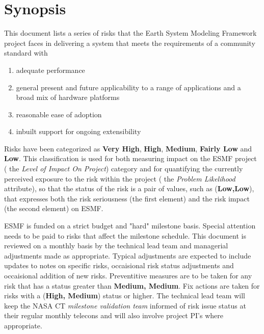\documentclass[english]{article}
\begin{document}




\newpage
\tableofcontents

\newpage
\section{Synopsis}

This document lists a series of risks that the Earth System Modeling Framework project faces
in delivering a system that meets the requirements of a community standard with

\begin{enumerate}
\item adequate performance
\item general present and future applicability to a range of applications and a broad mix of hardware platforms
\item reasonable ease of adoption
\item inbuilt support for ongoing extensibility
\end{enumerate}

Risks have been categorized as {\bf Very High}, {\bf High}, {\bf Medium}, {\bf Fairly Low} and {\bf Low}.
This classification is used for both measuring impact on the ESMF project ( the {\it Level of Impact On Project})
category and for quantifying the currently perceived exposure to the risk within
the project ( the {\it Problem Likelihood} attribute), so that the
status of the risk is a pair of values, such as ({\bf Low,Low}), that expresses
both the risk seriousness (the first element) and the risk impact (the second element) on
ESMF.  

ESMF is funded on a strict budget and "hard" milestone basis. Special attention needs to be
paid to risks that affect the milestone schedule.
This document is reviewed on a monthly basis by the technical lead team and managerial adjustments
made as appropriate. Typical adjustments are expected to include updates to notes on specific risks,
occaisional risk status adjustments and occaisional addition of new risks.
Preventitive measures are to be taken for any risk that has a status greater than {\bf Medium, Medium}.
Fix actions are taken for risks with a ({\bf High, Medium}) status or higher.
The technical lead team will keep the NASA CT {\it milestone validation team} informed of 
risk issue status at their regular monthly telecons and will also involve project PI's where 
appropriate.
\end{document}
